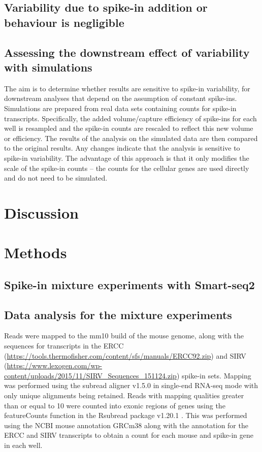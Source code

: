 \documentclass{article}
\begin{document}
\subsection{Variability due to spike-in addition or behaviour is negligible}

\subsection{Assessing the downstream effect of variability with simulations}
The aim is to determine whether results are sensitive to spike-in variability, for downstream analyses that depend on the assumption of constant spike-ins.
Simulations are prepared from real data sets containing counts for spike-in transcripts.
Specifically, the added volume/capture efficiency of spike-ins for each well is resampled and the spike-in counts are rescaled to reflect this new volume or efficiency.
The results of the analysis on the simulated data are then compared to the original results.
Any changes indicate that the analysis is sensitive to spike-in variability.
The advantage of this approach is that it only modifies the scale of the spike-in counts -- the counts for the cellular genes are used directly and do not need to be simulated.

\section{Discussion}

\section{Methods}

\subsection{Spike-in mixture experiments with Smart-seq2}

\subsection{Data analysis for the mixture experiments}
Reads were mapped to the mm10 build of the mouse genome, along with the sequences for transcripts in the ERCC (\url{https://tools.thermofisher.com/content/sfs/manuals/ERCC92.zip}) and SIRV (\url{https://www.lexogen.com/wp-content/uploads/2015/11/SIRV_Sequences_151124.zip}) spike-in sets.
Mapping was performed using the subread aligner v1.5.0 \cite{liao2013subread} in single-end RNA-seq mode with only unique alignments being retained.
Reads with mapping qualities greater than or equal to 10 were counted into exonic regions of genes using the featureCounts function in the Rsubread package v1.20.1 \cite{liao2014featurecounts}.
This was performed using the NCBI mouse annotation GRCm38 along with the annotation for the ERCC and SIRV transcripts to obtain a count for each mouse and spike-in gene in each well.
\end{document}
